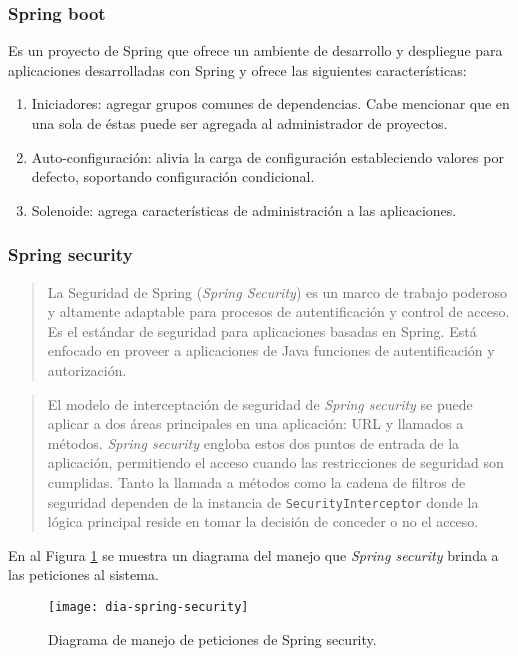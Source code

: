 \subsubsection{Spring boot}\label{sec:spring-boot}
Es un proyecto de Spring que ofrece un ambiente de desarrollo y despliegue para aplicaciones desarrolladas con Spring y ofrece las siguientes características\cite{SpringBootInAction}:
\begin{enumerate}
	\item Iniciadores: agregar grupos comunes de dependencias. Cabe mencionar que en una sola de éstas puede ser agregada al administrador de proyectos.
	\item Auto-configuración: alivia la carga de configuración estableciendo valores por defecto, soportando configuración condicional.
	\item Solenoide: agrega características de administración a las aplicaciones.
\end{enumerate}

\subsubsection{Spring security}\label{sec:spring-security}
\begin{quote}
	La Seguridad de Spring (\textit{Spring Security}) es un marco de trabajo poderoso y altamente adaptable para procesos de autentificación y control de acceso. Es el estándar de seguridad para aplicaciones basadas en Spring. Está enfocado en proveer a aplicaciones de Java funciones de autentificación y autorización\cite{SpringSecurity}.
\end{quote}

\begin{quote}
	El modelo de interceptación de seguridad de \textit{Spring security} se puede aplicar a dos áreas principales en una aplicación: URL y llamados a métodos. \textit{Spring security} engloba estos dos puntos de entrada de la aplicación, permitiendo el acceso cuando las restricciones de seguridad son cumplidas. Tanto la llamada a métodos como la cadena de filtros de seguridad dependen de la instancia de \texttt{SecurityInterceptor} donde la lógica principal reside en tomar la decisión de conceder o no el acceso\cite{ProSpringSecurity}.
\end{quote}
En al Figura \ref{fig:dia-spring-security} se muestra un diagrama del manejo que \textit{Spring security} brinda a las peticiones al sistema.

\begin{figure}[h]
	\centering
	\texttt{[image: dia-spring-security]}
	\caption{Diagrama de manejo de peticiones de Spring security\cite{ProSpringSecurity}.}
	\label{fig:dia-spring-security}
\end{figure}

